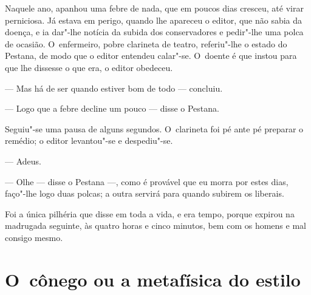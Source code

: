 \begin{linenumbers}
Naquele ano, apanhou uma febre de nada, que em poucos dias cresceu, até
virar perniciosa. Já estava em perigo, quando lhe apareceu o editor, que
não sabia da doença, e ia dar"-lhe notícia da subida dos conservadores e
pedir"-lhe uma polca de ocasião. O~enfermeiro, pobre clarineta de teatro,
referiu"-lhe o estado do Pestana, de modo que o editor entendeu calar"-se.
O~doente é que instou para que lhe dissesse o que era, o editor
obedeceu.

--- Mas há de ser quando estiver bom de todo --- concluiu.

--- Logo que a febre decline um pouco --- disse o Pestana.

Seguiu"-se uma pausa de alguns segundos. O~clarineta foi pé ante pé
preparar o remédio; o editor levantou"-se e despediu"-se.

--- Adeus.

--- Olhe --- disse o Pestana ---, como é provável que eu morra por estes
dias, faço"-lhe logo duas polcas; a outra servirá para quando subirem os
liberais.

Foi a única pilhéria que disse em toda a vida, e era tempo, porque
expirou na madrugada seguinte, às quatro horas e cinco minutos, bem com
os homens e mal consigo mesmo.

\end{linenumbers}

\chapter{O~cônego ou a metafísica do estilo}

